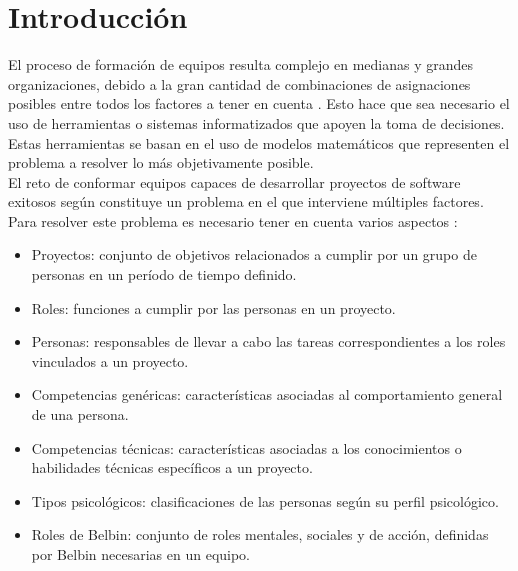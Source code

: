 \chapter*{Introducción}

El proceso de formación de equipos resulta complejo en medianas y grandes organizaciones, debido a la gran cantidad de combinaciones de asignaciones posibles entre todos los factores a tener en cuenta \cite{Mayi09}. Esto hace que sea necesario el uso de herramientas o sistemas informatizados que apoyen la toma de decisiones. Estas herramientas se basan en el uso de modelos matemáticos que representen el problema a resolver lo más objetivamente posible.\\ 

El reto de conformar equipos capaces de desarrollar proyectos de software exitosos según \cite{ana14} constituye un problema en el que interviene múltiples factores. Para resolver este problema es necesario tener en cuenta varios aspectos \cite{ana15}:
\begin{itemize}
	
\item Proyectos: conjunto de objetivos relacionados a cumplir por un grupo de personas en un período de tiempo definido.

\item Roles: funciones a cumplir por las personas en un proyecto.

\item Personas: responsables de llevar a cabo las tareas correspondientes a los roles vinculados a un proyecto.

\item Competencias genéricas: características asociadas al comportamiento general de una persona.

\item Competencias técnicas: características asociadas a los conocimientos o habilidades técnicas específicos a un proyecto. 

\item Tipos psicológicos: clasificaciones de las personas según su perfil psicológico.

\item Roles de Belbin: conjunto de roles mentales, sociales y de acción, definidas por Belbin necesarias en un equipo.

\end{itemize}	

